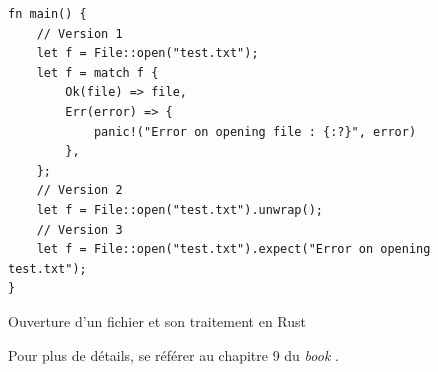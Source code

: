 \bigbreak
\begin{code}
    \begin{verbatim}
fn main() {
    // Version 1
    let f = File::open("test.txt");
    let f = match f {
        Ok(file) => file,
        Err(error) => {
            panic!("Error on opening file : {:?}", error)
        },
    };
    // Version 2
    let f = File::open("test.txt").unwrap();
    // Version 3
    let f = File::open("test.txt").expect("Error on opening test.txt");
}
    \end{verbatim}
    \caption{Ouverture d'un fichier et son traitement en Rust}
    \label{rust_result_file}
\end{code}
\bigbreak
Pour plus de détails, se référer au chapitre 9 du \textit{book} \cite{ref0}.


